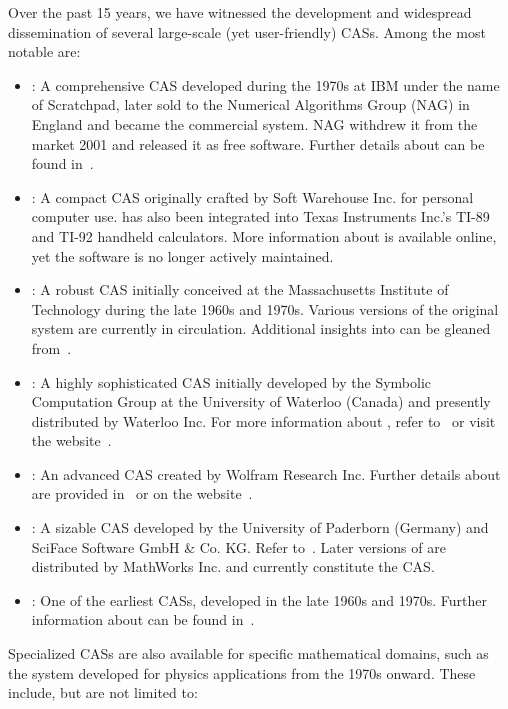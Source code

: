 Over the past 15 years, we have witnessed the development and widespread dissemination of several large-scale (yet user-friendly) \acp{CAS}. Among the most notable are:
%
\begin{itemize}
  \setlength{\itemsep}{0.0em}
  \item \Axiom{}: A comprehensive \ac{CAS} developed during the 1970s at IBM under the name of Scratchpad, later sold to the Numerical Algorithms Group (NAG) in England and became the \Axiom{} commercial system. NAG withdrew it from the market 2001 and released it as free software. Further details about \Axiom{} can be found in~\citet{jenks1992axiom}.
  \item \Derive{}: A compact \ac{CAS} originally crafted by Soft Warehouse Inc. for personal computer use. \Derive{} has also been integrated into Texas Instruments Inc.'s TI-89 and TI-92 handheld calculators. More information about \Derive{} is available online, yet the software is no longer actively maintained.
  \item \Macsyma{}: A robust \ac{CAS} initially conceived at the Massachusetts Institute of Technology during the late 1960s and 1970s. Various versions of the original \Macsyma{} system are currently in circulation. Additional insights into \Macsyma{} can be gleaned from~\citet{wester1999computer}.
  \item \Maple{}: A highly sophisticated \ac{CAS} initially developed by the Symbolic Computation Group at the University of Waterloo (Canada) and presently distributed by Waterloo \Maple{} Inc. For more information about \Maple{}, refer to~\citet{heck2003introduction} or visit the website~\cite{maple}.
  \item \Mathematica{}: An advanced \ac{CAS} created by Wolfram Research Inc. Further details about \Mathematica{} are provided in~\citet{wolfram2003mathematica} or on the website~\cite{mathematica}.
  \item \MuPAD{}: A sizable \ac{CAS} developed by the University of Paderborn (Germany) and SciFace Software GmbH \& Co. KG. Refer to~\citet{creutzig2004mupad}. Later versions of \MuPAD{} are distributed by MathWorks Inc. and currently constitute the \Matlab{} \ac{CAS}.
  \item \Reduce{}: One of the earliest \acp{CAS}, developed in the late 1960s and 1970s. Further information about \Reduce{} can be found in~\citet{rayna1987reduce}.
\end{itemize}
%
Specialized \acp{CAS} are also available for specific mathematical domains, such as the system developed for physics applications from the 1970s onward. These include, but are not limited to:
